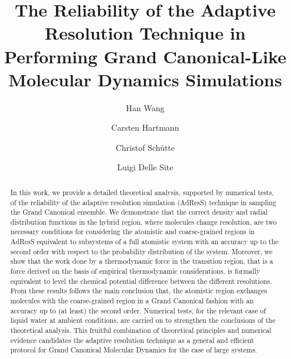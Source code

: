 \documentclass[aip,jcp,a4paper,reprint,onecolumn]{revtex4-1}
\begin{document}
\title{The Reliability of the Adaptive Resolution Technique in Performing  Grand Canonical-Like Molecular Dynamics Simulations}
\author{Han Wang}
\author{Carsten Hartmann}
\author{Christof Sch\"utte}
\author{Luigi Delle Site}

\begin{abstract}
  In this work, we provide a detailed theoretical analysis, supported by numerical tests, of the
  reliability of the adaptive resolution simulation (AdResS) technique in sampling the Grand Canonical
  ensemble. We demonstrate that the correct density and radial distribution
  functions in the hybrid region, where molecules change resolution, are two necessary conditions for
  considering the atomistic and coarse-grained regions in AdResS equivalent to subsystems
  of a full atomistic system with an accuracy up to the second order with respect to the probability distribution of the system. Moreover, we show that the
  work done by a thermodynamic force in the transition region, that is a force derived on the basis of empirical thermodynamic considerations, is formally equivalent to level the chemical
  potential difference between the different resolutions. From these results follows the main conclusion that, the atomistic region exchanges
  molecules with the coarse-grained region in a Grand Canonical
  fashion with an accuracy up to (at least) the second order. Numerical tests, for the relevant case of liquid water at ambient conditions, are carried on to strengthen the conclusions of the theoretical analysis.
  This fruitful combination of theoretical principles and numerical evidence candidates the adaptive resolution technique as a general and efficient protocol for Grand Canonical Molecular Dynamics for the case of large systems.
\end{abstract}

\maketitle
\end{document}
